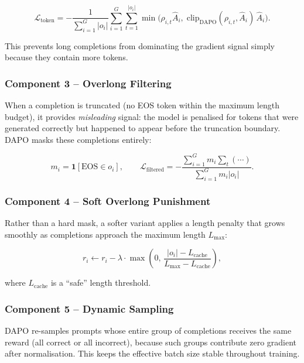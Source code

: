 \[
\mathcal{L}_{\text{token}} =
    -\frac{1}{\sum_{i=1}^G |o_i|}
    \sum_{i=1}^G \sum_{t=1}^{|o_i|}
    \min\!\bigl(\rho_{i,t}\hat{A}_i,\;
                \mathrm{clip}_{\text{DAPO}}(\rho_{i,t},\hat{A}_i)\,\hat{A}_i\bigr).
\]

This prevents long completions from dominating the gradient signal simply because they contain more tokens.

\subsubsection*{Component 3 -- Overlong Filtering}
\label{component-3-overlong-filtering}

When a completion is truncated (no EOS token within the maximum length budget), it provides \emph{misleading} signal: the model is penalised for tokens that were generated correctly but happened to appear before the truncation boundary. DAPO masks these completions entirely:

\[
m_i = \mathbf{1}[\text{EOS} \in o_i], \qquad
  \mathcal{L}_{\text{filtered}} =
    -\frac{\sum_{i=1}^G m_i \sum_t (\cdots)}{\sum_{i=1}^G m_i |o_i|}.
\]

\subsubsection*{Component 4 -- Soft Overlong Punishment}
\label{component-4-soft-overlong-punishment}

Rather than a hard mask, a softer variant applies a length penalty that grows smoothly as completions approach the maximum length $L_{\max}$:

\[
r_i \leftarrow r_i - \lambda \cdot \max\!\left(0,\, \frac{|o_i| - L_{\text{cache}}}{L_{\max} - L_{\text{cache}}}\right),
\]

where $L_{\text{cache}}$ is a ``safe'' length threshold.

\subsubsection*{Component 5 -- Dynamic Sampling}
\label{component-5-dynamic-sampling}

DAPO re-samples prompts whose entire group of completions receives the same reward (all correct or all incorrect), because such groups contribute zero gradient after normalisation. This keeps the effective batch size stable throughout training.

